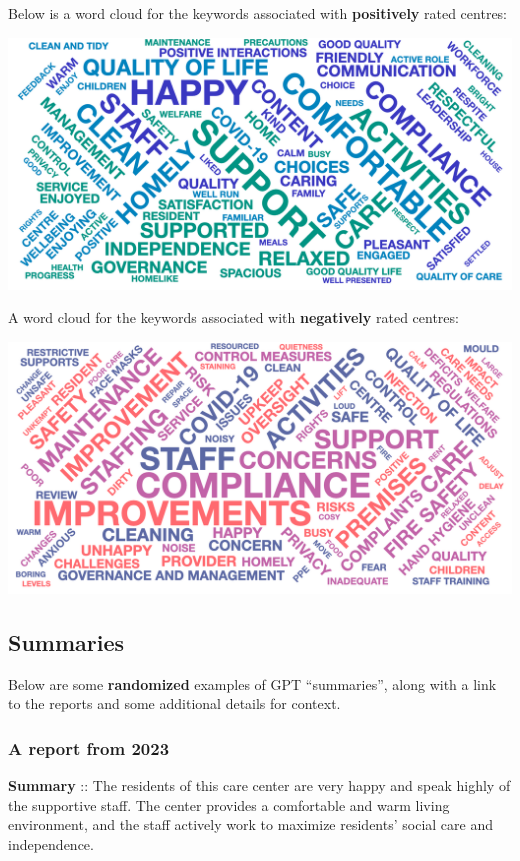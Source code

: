 \documentclass[a4paper,11pt,twoside]{article}
\begin{document}
Below is a word cloud for the keywords associated with \textbf{positively} rated centres:

\begin{center}
\includegraphics[width=.9\linewidth]{img/19_word_cloud_pos.png}
\end{center}

A word cloud for the keywords associated with \textbf{negatively} rated centres:

\begin{center}
\includegraphics[width=.9\linewidth]{img/20_word_cloud_neg.png}
\end{center}
\subsection{Summaries}
\label{sec:orgcdaabec}

Below are some \textbf{randomized} examples of GPT ``summaries'', along with a link to the reports and some additional details for context.
\subsubsection{A report from 2023}
\label{sec:org1445adc}

\textbf{Summary} :: The residents of this care center are very happy and speak highly of the supportive staff. The center provides a comfortable and warm living environment, and the staff actively work to maximize residents' social care and independence.
\end{document}
